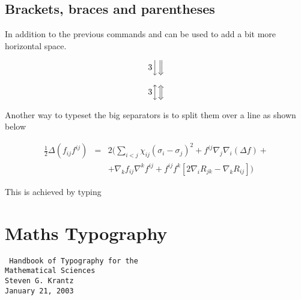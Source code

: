 \section{Brackets, braces and parentheses}

In addition  to the previous commands  and  can be used to add a bit more horizontal space.

\[3\Big\downarrow 
\Big\Downarrow\]


\[3\Big\updownarrow
\Big\Updownarrow\]

Another way to typeset the big separators is to split them over a line as shown below

{\arraycolsep=2pt
 \begin{equation}
 \begin{array}{rcl}
 \frac{1}{2}\Delta(f_{ij}f^{ij}) & = & 2\Bigg({\displaystyle
 \sum_{i<j}}\chi_{ij}(\sigma_{i}-\sigma_{j})^{2}+f^{ij}%
 \nabla_{j}\nabla_{i}(\Delta f)+\\
 & & +\nabla_{k}f_{ij}\nabla^{k}f^{ij}+f^{ij}f^{k}[2
 \nabla_{i}R_{jk}-\nabla_{k}R_{ij}]\Bigg)
 \end{array}
 \end{equation}

This is achieved by typing

\begin{teX}
{\arraycolsep=2pt
 \begin{equation}
 \begin{array}{rcl}
 \frac{1}{2}\Delta(f_{ij}f^{ij}) & = & 2\Bigg({\displaystyle
 \sum_{i<j}}\chi_{ij}(\sigma_{i}-\sigma_{j})^{2}+f^{ij}%
 \nabla_{j}\nabla_{i}(\Delta f)+\\
 & & +\nabla_{k}f_{ij}\nabla^{k}f^{ij}+f^{ij}f^{k}[2
 \nabla_{i}R_{jk}-\nabla_{k}R_{ij}]\Bigg)
 \end{array}
 \end{equation}

\end{teX}



\chapter{Maths Typography}

\texttt{
Handbook of Typography for the\\
Mathematical Sciences\\
Steven G. Krantz\\
January 21, 2003}\par

}
